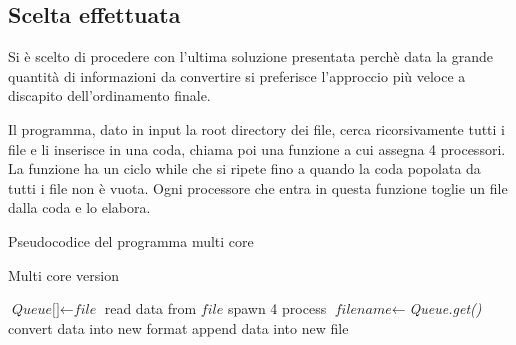 \documentclass[../main.tex]{subfiles}
\begin{document}
\subsection{Scelta effettuata}

Si è scelto di procedere con l'ultima soluzione presentata perchè data la grande quantità di informazioni da convertire si preferisce l'approccio più veloce a discapito dell'ordinamento finale.

Il programma, dato in input la root directory dei file, cerca ricorsivamente tutti i file e li inserisce in una coda, chiama poi una funzione a cui assegna 4 processori. La funzione ha un ciclo while che si ripete fino a quando la coda popolata da tutti i file non è vuota. Ogni processore che entra in questa funzione toglie un file dalla coda e lo elabora. \newline

Pseudocodice del programma multi core
\begin{algorithm}
\caption{Multi core version}\label{multi core version}
\begin{algorithmic}[1]
\State $\textit{Queue[]} \gets \textit{file}$
\State read data from $\textit{file}$
\State spawn 4 process
\State $\textit{filename} \gets $\textit{Queue.get()}
\State convert data into new format
\State append data into new file
\EndWhile
\EndFor
\EndProcedure
\end{algorithmic}
\end{algorithm}
\end{document}
